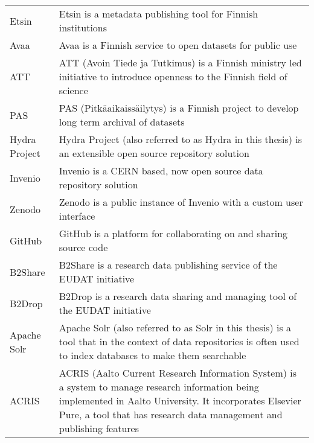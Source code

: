 \begin{longtable}{@{}p{}p{}@{}}
Etsin & Etsin is a metadata publishing tool for Finnish institutions \\
Avaa & Avaa is a Finnish service to open datasets for public use \\
ATT & ATT (Avoin Tiede ja Tutkimus) is a Finnish ministry led initiative to introduce openness to the Finnish field of science \\
PAS & PAS (Pitkäaikaissäilytys) is a Finnish project to develop long term archival of datasets \\
Hydra Project & Hydra Project (also referred to as Hydra in this thesis) is an extensible open source repository solution \\
Invenio & Invenio is a CERN based, now open source data repository solution \\
Zenodo & Zenodo is a public instance of Invenio with a custom user interface \\
GitHub & GitHub is a platform for collaborating on and sharing source code \\
B2Share & B2Share is a research data publishing service of the EUDAT initiative \\
B2Drop & B2Drop is a research data sharing and managing tool of the EUDAT initiative \\
Apache Solr & Apache Solr (also referred to as Solr in this thesis) is a tool that in the context of data repositories is often
used to index databases to make them searchable \\
ACRIS &  ACRIS (Aalto Current Research Information System) is a system to manage research information being implemented in Aalto University.
It incorporates Elsevier Pure, a tool that has research data management and publishing features

\end{longtable}
